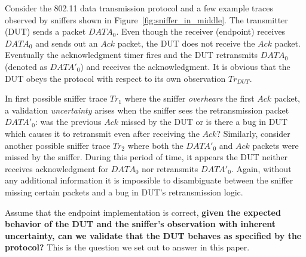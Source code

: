 Consider the 802.11 data transmission protocol and a few example traces observed by
sniffers shown in Figure~\ref{fig:sniffer_in_middle}.
%
The transmitter (DUT) sends a packet $DATA_0$.
%
Even though the receiver (endpoint) receives $DATA_0$ and sends out an $Ack$
packet, the DUT does not receive the $Ack$ packet.
%
Eventually the acknowledgment timer fires and the DUT retransmits $DATA_0$
(denoted as $DATA'_0$) and receives the acknowledgment.
%
It is obvious that the DUT obeys the protocol with respect to its own
observation $Tr_{DUT}$.

In first possible sniffer trace $Tr_1$ where the sniffer \textit{overhears} the
first $Ack$ packet, a validation \textit{uncertainty} arises when the sniffer
sees the retransmission packet $DATA'_0$: was the previous $Ack$ missed by the
DUT or is there a bug in DUT which causes it to retransmit even after receiving
the $Ack$?
%
Similarly, consider another possible sniffer trace
$Tr_2$ where both the $DATA'_0$ and $Ack$ packets were missed by the sniffer.
%
During this period of time, it appears the DUT neither receives acknowledgment
for $DATA_0$ nor retransmits $DATA'_0$.
%
Again, without any additional information it is impossible to disambiguate between the
sniffer missing certain packets and a bug in DUT's retransmission logic.

Assume that the endpoint implementation is correct, \textbf{given the expected
behavior of the DUT and the sniffer's observation with inherent uncertainty, can
we validate that the DUT behaves as specified by the protocol?}
%
This is the question we set out to answer in this paper.
